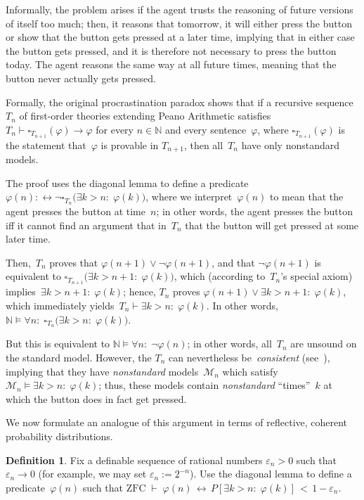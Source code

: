\documentclass[12pt]{article}
\newcommand{\vp}{\varphi}
\newcommand{\NN}{\mathbb{N}}
\newcommand{\zfc}{\mathrm{ZFC}}
\newcommand{\cM}{\mathcal{M}}
\theoremstyle{plain}
\theoremstyle{definition}
\newtheorem{definition}[theorem]{Definition}
\theoremstyle{remark}
\begin{document}
Informally, the problem arises if the agent trusts the reasoning of future versions of itself too much; then, it reasons that tomorrow, it will either press the button or show that the button gets pressed at a later time, implying that in either case the button gets pressed, and it is therefore not necessary to press the button today. The agent reasons the same way at all future times, meaning that the button never actually gets pressed.

Formally, the original procrastination paradox shows that if a recursive sequence~$T_n$ of first-order theories extending Peano Arithmetic satisfies $T_n \vdash \square_{T_{n+1}}(\vp)\to\vp$ for every $n\in\NN$ and every sentence~$\vp$, where $\square_{T_{n+1}}(\vp)$ is the statement that~$\vp$ is provable in $T_{n+1}$, then all~$T_n$ have only nonstandard models.

The proof uses the diagonal lemma to define a predicate~$\vp(n) :\leftrightarrow \neg\square_{T_n}\big(\exists k>n{:}\;\vp(k)\big)$, where we interpret~$\vp(n)$ to mean that the agent presses the button at time~$n$; in other words, the agent presses the button iff it cannot find an argument that in~$T_n$ that the button will get pressed at some later time.

Then,~$T_n$ proves that $\vp(n+1)\vee\neg\vp(n+1)$, and that $\neg\vp(n+1)$ is equivalent to $\square_{T_{n+1}}\big(\exists k>n+1{:}\;\vp(k)\big)$, which (according to~$T_n$'s special axiom) implies~$\exists k>n+1{:}\;\vp(k)$; hence, $T_n$ proves $\vp(n+1)\vee\exists k>n+1{:}\;\vp(k)$, which immediately yields~$T_n\vdash\exists k>n{:}\;\vp(k)$. In other words, $\NN\vDash\forall n{:}\;\square_{T_n}\big(\exists k>n{:}\;\vp(k)\big)$. 

But this is equivalent to $\NN\vDash\forall n{:}\;\neg\vp(n)$; in other words, all~$T_n$ are unsound on the standard model. However, the $T_n$ can nevertheless be~\emph{consistent} (see~\cite{yudkowsky13}), implying that they have \emph{nonstandard} models~$\cM_n$ which satisfy $\cM_n\vDash\exists k>n{:}\;\vp(k)$; thus, these models contain \emph{nonstandard} ``times''~$k$ at which the button does in fact get pressed.

We now formulate an analogue of this argument in terms of reflective, coherent probability  distributions.

\begin{definition}
Fix a definable sequence of rational numbers $\varepsilon_n > 0$ such that $\varepsilon_n\to0$ (for example, we may set $\varepsilon_n := 2^{-n}$). Use the diagonal lemma to define a predicate~$\vp(n)$ such that $\zfc\;\vdash\;\vp(n)\,\leftrightarrow\, P[\exists k>n{:}\;\vp(k)] \,<\, 1 - \varepsilon_n$.
\end{definition}
\end{document}

